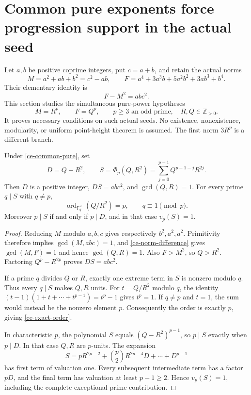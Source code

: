\section{Common pure exponents force progression support in the actual seed}
\label{sec-common-exponent-compatibility}

Let $a,b$ be positive coprime integers, put $c=a+b$, and retain the
actual norms
\[
 M=a^2+ab+b^2=c^2-ab,\qquad
 F=a^4+3a^3b+5a^2b^2+3ab^3+b^4.
\]
Their elementary identity is
\begin{equation}\label{ce-norm-difference}
 F-M^2=ab c^2.
\end{equation}
This section studies the simultaneous pure-power hypotheses
\begin{equation}\label{ce-common-pure}
 M=R^p,\qquad F=Q^p,\qquad
 p\ge3\text{ an odd prime},\quad R,Q\in\mathbb Z_{>0}.
\end{equation}
It proves necessary conditions on such actual seeds. No existence,
nonexistence, modularity, or uniform point-height theorem is assumed.
The first norm $3R^p$ is a different branch.

\begin{lemma}
\label{ce-cyclotomic-allocation}
Under \eqref{ce-common-pure}, set
\[
 D=Q-R^2,\qquad
 S=\Phi_p(Q,R^2)=\sum_{j=0}^{p-1}Q^{p-1-j}R^{2j}.
\]
Then $D$ is a positive integer, $DS=ab c^2$, and $\gcd(Q,R)=1$.
For every prime $q\mid S$ with $q\ne p$,
\begin{equation}\label{ce-exact-order}
 \operatorname{ord}_{\mathbb F_q^\times}(Q/R^2)=p,
 \qquad q\equiv1\pmod p.
\end{equation}
Moreover $p\mid S$ if and only if $p\mid D$, and in that case
$v_p(S)=1$.
\end{lemma}
\begin{proof}
Reducing $M$ modulo $a,b,c$ gives respectively $b^2,a^2,a^2$.
Primitivity therefore implies $\gcd(M,abc)=1$, and
\eqref{ce-norm-difference} gives $\gcd(M,F)=1$ and hence
$\gcd(Q,R)=1$. Also $F>M^2$, so $Q>R^2$. Factoring
$Q^p-R^{2p}$ proves $DS=ab c^2$.

If a prime $q$ divides $Q$ or $R$, exactly one extreme term in $S$
is nonzero modulo $q$. Thus every $q\mid S$ makes $Q,R$ units.
For $t=Q/R^2$ modulo $q$, the identity
$(t-1)(1+t+\cdots+t^{p-1})=t^p-1$ gives $t^p=1$.
If $q\ne p$ and $t=1$, the sum would instead be the nonzero
element $p$. Consequently the order is exactly $p$, giving
\eqref{ce-exact-order}.

In characteristic $p$, the polynomial $S$ equals $(Q-R^2)^{p-1}$,
so $p\mid S$ exactly when $p\mid D$. In that case $Q,R$ are
$p$-units. The expansion
\[
 S=pR^{2p-2}+\binom p2R^{2p-4}D+\cdots+D^{p-1}
\]
has first term of valuation one. Every subsequent intermediate
term has a factor $pD$, and the final term has valuation at least
$p-1\ge2$. Hence $v_p(S)=1$, including the complete exceptional
prime contribution.
\end{proof}


